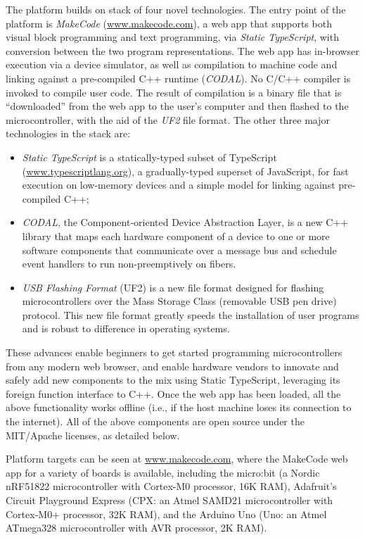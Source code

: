 The platform builds on stack of four novel technologies.
The entry point of the platform is \emph{MakeCode} (\url{www.makecode.com}),
a web app that supports both visual block programming and text programming,
via \emph{Static TypeScript}, with conversion 
between the two program representations. The web app has in-browser execution 
via a device simulator, as well as compilation to machine code and linking against a 
pre-compiled C++ runtime (\emph{CODAL}). No C/C++ compiler is invoked to compile user code. 
The result of compilation is a binary file that is ``downloaded'' from the web app to the user's 
computer and then flashed to the microcontroller, with the aid of the \emph{UF2} file format.
The other three major technologies in the stack are:
\begin{itemize}

\item \emph{Static TypeScript} is a statically-typed subset of TypeScript (\url{www.typescriptlang.org}), 
a gradually-typed superset of JavaScript, for fast execution on low-memory devices 
and a simple model for linking against pre-compiled C++; 

\item \emph{CODAL}, the Component-oriented Device Abstraction Layer, is a new C++ library that maps 
each hardware component of a device to one or more software components that communicate over a message bus and
schedule event handlers to run non-preemptively on fibers. 

\item \emph{USB Flashing Format} (UF2) is a new file format designed for flashing microcontrollers over the Mass Storage
Class (removable USB pen drive) protocol.  This new file format greatly speeds the installation of user programs
and is robust to difference in operating systems.
\end{itemize}
These advances enable beginners to get started programming microcontrollers from any modern web browser, and enable
hardware vendors to innovate and safely add new components to the mix using Static TypeScript, leveraging its
foreign function interface to C++. Once the web app has been loaded, 
all the above functionality works offline (i.e., if the host machine loses its connection 
to the internet).
All of the above components are open source under the MIT/Apache licenses, as detailed below. 

Platform targets can be seen at \url{www.makecode.com}, where the MakeCode web app for a variety of boards is available, 
including the micro:bit (a Nordic nRF51822 microcontroller with Cortex-M0 processor, 16K RAM), Adafruit's Circuit 
Playground Express (CPX: an Atmel SAMD21 microcontroller with Cortex-M0+ processor, 32K RAM), and the Arduino Uno 
(Uno: an Atmel ATmega328 microcontroller with AVR processor, 2K RAM). 

